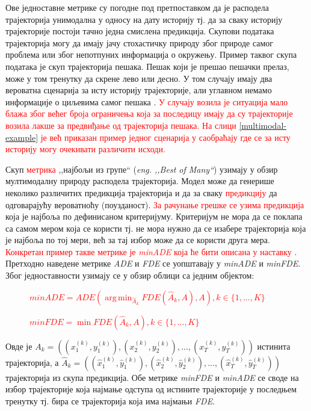 \documentclass[11pt,oneside]{memoir}
\DeclareMathOperator*{\argmin}{arg\,min}
\begin{document}
Ове једноставне метрике су погодне под претпоставком да је расподела трајекторија унимодална у односу на дату историју тј. да за сваку историју трајекторије 
постоји тачно једна смислена предикција. 
Скупови података трајекторија могу да имају јачу стохастичку природу због природе самог проблема или због непотпуних информација о окружењу.
Пример таквог скупа података је скуп трајекторија пешака. Пешак који је прешао пешачки прелаз, може у том тренутку да скрене лево или десно.
У том случају имају два вероватна сценарија за исту историју трајекторије, али углавном немамо информације о циљевима самог пешака \cite{social_gan, best_of_many_cvae}. 
\textcolor{red}{У случају возила је ситуација мало блажа због већег броја ограничења која за последицу имају да су трајекторије возила
лакше за предвиђање од трајекторија пешака. На слици \ref{multimodal-example} је већ приказан пример једног сценарија у саобраћају где
се за исту историју могу очекивати различити исходи.}

Скуп \textcolor{red}{метрика} ,,најбољи из групе`` (\textit{eng. ,,Best of Many``}) узимају у обзир мултимодалну природу расподела трајекторија. Модел може
да генерише неколико различитих предикција трајекторија и да за сваку \textcolor{red}{предикцију} да одговарајућу вероватноћу (поузданост). 
\textcolor{red}{За рачунање грешке се узима предикција} која је најбоља по дефинисаном критеријуму. Критеријум не мора да се поклапа са самом мером која се користи 
тј. не мора нужно да се изабере трајекторија која је најбоља по тој мери, већ за тај избор може да се користи друга мера. 
\textcolor{red}{Конкретан пример такве метрике је \textit{minADE} која ће бити описана у наставку} \cite{best_of_many_cvae, argoverse}. 
Претходно наведене метрике \textit{ADE} и \textit{FDE} се уопштавају у \textit{minADE} и \textit{minFDE}. Због једноставности узимају се у обзир облици
са једним објектом: \cite{Disdis, best_of_many_cvae}

\begin{figure}[H]
  \centering
  \textcolor{red}{$minADE = ADE(\displaystyle\argmin_{\hat{A}_k} FDE(\hat{A}_k, A), A), k \in \{1, ..., K\}$}
\end{figure}

\begin{figure}[H]
  \centering
  \textcolor{red}{$minFDE = \displaystyle\min FDE(\hat{A}_k, A), k \in \{1, ..., K\}$}
\end{figure}

Овде је $A_k = ((x^{(k)}_1, y^{(k)}_1), (x^{(k)}_2, y^{(k)}_2), ...,  (x^{(k)}_T, y^{(k)}_T))$ истинита трајекторија, а 
$\hat{A}_k = ((\hat{x}^{(k)}_1, \hat{y}^{(k)}_1), (\hat{x}^{(k)}_2, \hat{y}^{(k)}_2), ...,  (\hat{x}^{(k)}_T, \hat{y}^{(k)}_T))$ 
трајекторија из скупа предикција. Обе метрике \textit{minFDE} и \textit{minADE} 
се своде на избор трајекторије која најмање одступа од истините трајекторије у последњем тренутку тј. бира се трајекторија која има најмањи \textit{FDE}.
\end{document}
